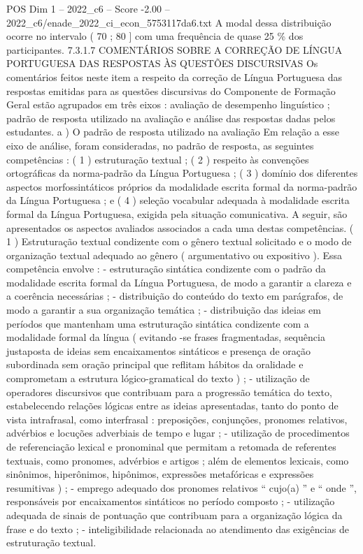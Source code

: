 \begin{textsample}{POS Dim 1 – 2022\_c6 – Score -2.00 – 2022\_c6/enade\_2022\_ci\_econ\_5753117da6.txt}
A modal dessa distribuição ocorre no intervalo ( 70 ; 80 ] com uma frequência de quase 25 \% dos participantes. 7.3.1.7 COMENTÁRIOS SOBRE A CORREÇÃO DE LÍNGUA PORTUGUESA DAS RESPOSTAS ÀS QUESTÕES DISCURSIVAS Os comentários feitos neste item a respeito da correção de Língua Portuguesa das respostas emitidas para as questões discursivas do Componente de Formação Geral estão agrupados em três eixos : avaliação de desempenho linguístico ; padrão de resposta utilizado na avaliação e análise das respostas dadas pelos estudantes. a ) O padrão de resposta utilizado na avaliação Em relação a esse eixo de análise, foram consideradas, no padrão de resposta, as seguintes competências : ( 1 ) estruturação textual ; ( 2 ) respeito às convenções ortográficas da norma-padrão da Língua Portuguesa ; ( 3 ) domínio dos diferentes aspectos morfossintáticos próprios da modalidade escrita formal da norma-padrão da Língua Portuguesa ; e ( 4 ) seleção vocabular adequada à modalidade escrita formal da Língua Portuguesa, exigida pela situação comunicativa.
A seguir, são apresentados os aspectos avaliados associados a cada uma destas competências. ( 1 ) Estruturação textual condizente com o gênero textual solicitado e o modo de organização textual adequado ao gênero ( argumentativo ou expositivo ).
Essa competência envolve : - estruturação sintática condizente com o padrão da modalidade escrita formal da Língua Portuguesa, de modo a garantir a clareza e a coerência necessárias ; - distribuição do conteúdo do texto em parágrafos, de modo a garantir a sua organização temática ; - distribuição das ideias em períodos que mantenham uma estruturação sintática condizente com a modalidade formal da língua ( evitando -se frases fragmentadas, sequência justaposta de ideias sem encaixamentos sintáticos e presença de oração subordinada sem oração principal que reflitam hábitos da oralidade e comprometam a estrutura lógico-gramatical do texto ) ; - utilização de operadores discursivos que contribuam para a progressão temática do texto, estabelecendo relações lógicas entre as ideias apresentadas, tanto do ponto de vista intrafrasal, como interfrasal : preposições, conjunções, pronomes relativos, advérbios e locuções adverbiais de tempo e lugar ; - utilização de procedimentos de referenciação lexical e pronominal que permitam a retomada de referentes textuais, como pronomes, advérbios e artigos ; além de elementos lexicais, como sinônimos, hiperônimos, hipônimos, expressões metafóricas e expressões resumitivas ) ; - emprego adequado dos pronomes relativos “ cujo(a) ” e “ onde ”, responsáveis por encaixamentos sintáticos no período composto ; - utilização adequada de sinais de pontuação que contribuam para a organização lógica da frase e do texto ; - inteligibilidade relacionada ao atendimento das exigências de estruturação textual.

\end{textsample}
